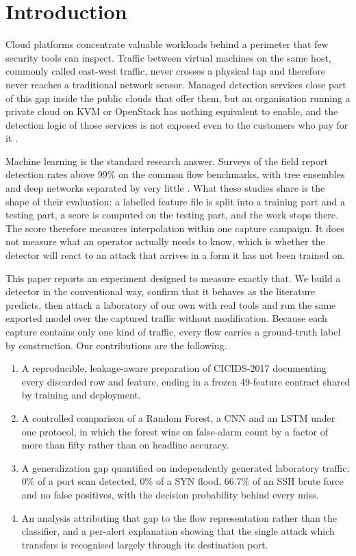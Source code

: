 \documentclass[runningheads]{llncs}
\begin{document}
\section{Introduction}

Cloud platforms concentrate valuable workloads behind a perimeter that few security tools can inspect. Traffic between virtual machines on the same host, commonly called east-west traffic, never crosses a physical tap and therefore never reaches a traditional network sensor. Managed detection services close part of this gap inside the public clouds that offer them, but an organisation running a private cloud on KVM or OpenStack has nothing equivalent to enable, and the detection logic of those services is not exposed even to the customers who pay for it \cite{aws_guardduty_suppression}.

Machine learning is the standard research answer. Surveys of the field report detection rates above 99\% on the common flow benchmarks, with tree ensembles and deep networks separated by very little \cite{ahmad2021network,ali2025dlvsml,kimanzi2024deep}. What these studies share is the shape of their evaluation: a labelled feature file is split into a training part and a testing part, a score is computed on the testing part, and the work stops there. The score therefore measures interpolation within one capture campaign. It does not measure what an operator actually needs to know, which is whether the detector will react to an attack that arrives in a form it has not been trained on.

This paper reports an experiment designed to measure exactly that. We build a detector in the conventional way, confirm that it behaves as the literature predicts, then attack a laboratory of our own with real tools and run the same exported model over the captured traffic without modification. Because each capture contains only one kind of traffic, every flow carries a ground-truth label by construction.
Our contributions are the following.

\begin{enumerate}
\item A reproducible, leakage-aware preparation of CICIDS-2017 documenting every discarded row and feature, ending in a frozen 49-feature contract shared by training and deployment.
\item A controlled comparison of a Random Forest, a CNN and an LSTM under one protocol, in which the forest wins on false-alarm count by a factor of more than fifty rather than on headline accuracy.
\item A generalization gap quantified on independently generated laboratory traffic: 0\% of a port scan detected, 0\% of a SYN flood, 66.7\% of an SSH brute force and no false positives, with the decision probability behind every miss.
\item An analysis attributing that gap to the flow representation rather than the classifier, and a per-alert explanation showing that the single attack which transfers is recognised largely through its destination port.
\end{enumerate}
\end{document}

